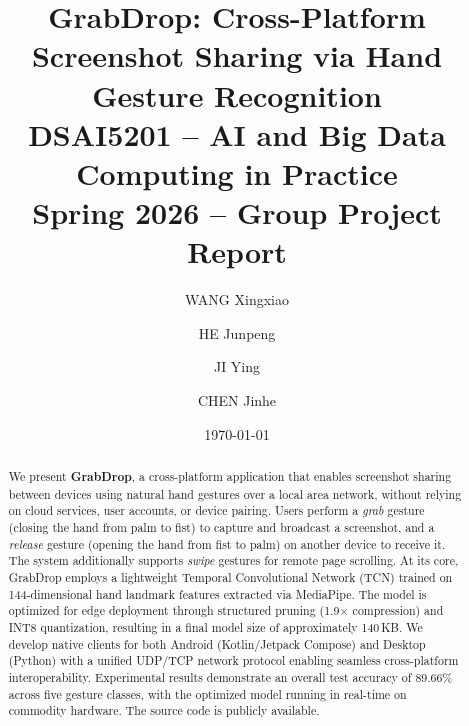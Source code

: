 \documentclass[11pt,a4paper]{article}
\title{%
  \textbf{GrabDrop: Cross-Platform Screenshot Sharing via Hand Gesture Recognition} \\[6pt]
  \large DSAI5201 -- AI and Big Data Computing in Practice \\
  Spring 2026 -- Group Project Report
}
\author{
  WANG Xingxiao \and HE Junpeng \and JI Ying \and CHEN Jinhe
}
\date{\today}
\begin{document}
\maketitle

\begin{abstract}
We present \textbf{GrabDrop}, a cross-platform application that enables
screenshot sharing between devices using natural hand gestures over a local
area network, without relying on cloud services, user accounts, or device
pairing. Users perform a \emph{grab} gesture (closing the hand from palm to
fist) to capture and broadcast a screenshot, and a \emph{release} gesture
(opening the hand from fist to palm) on another device to receive it. The
system additionally supports \emph{swipe} gestures for remote page scrolling.
At its core, GrabDrop employs a lightweight Temporal Convolutional Network
(TCN) trained on 144-dimensional hand landmark features extracted via
MediaPipe. The model is optimized for edge deployment through structured
pruning (1.9$\times$ compression) and INT8 quantization, resulting in a final
model size of approximately 140\,KB. We develop native clients for both
Android (Kotlin/Jetpack Compose) and Desktop (Python) with a unified UDP/TCP
network protocol enabling seamless cross-platform interoperability.
Experimental results demonstrate an overall test accuracy of 89.66\%
across five gesture classes, with the optimized model running in
real-time on commodity hardware. The source code is publicly available\cite{grabdrop}.
\end{abstract}














\newpage

\end{document}
